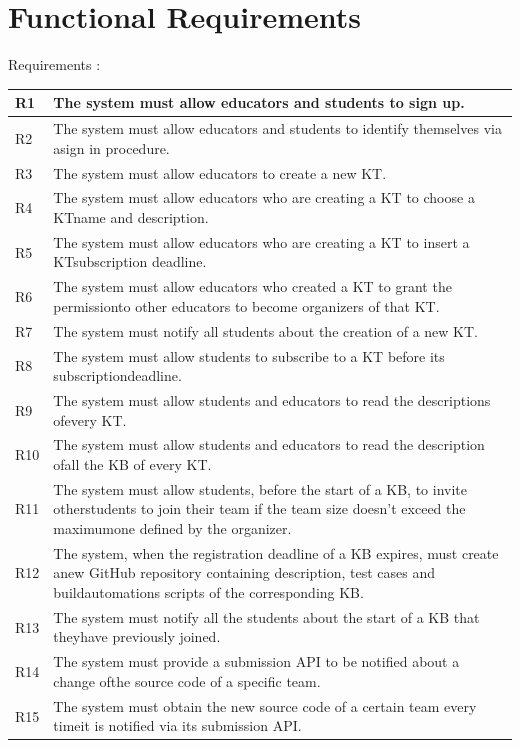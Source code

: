 \documentclass[11pt]{report}
\begin{document}
\section{Functional Requirements}
Requirements : 
\begin{table}[]
\begin{tabular}{|l|p{130mm}|}
\hline
R1 & The system must allow educators and students to sign up. \\ \hline
R2 & The system must allow educators and students to identify themselves via asign in procedure. \\ \hline
R3 & The system must allow educators to create a new KT. \\ \hline
R4 & The system must allow educators who are creating a KT to choose a KTname and description. \\ \hline
R5 & The system must allow educators who are creating a KT to insert a KTsubscription deadline. \\ \hline
R6 & The system must allow educators who created a KT to grant the permissionto other educators to become organizers of that KT. \\ \hline
R7 & The system must notify all students about the creation of a new KT. \\ \hline
R8 & The system must allow students to subscribe to a KT before its subscriptiondeadline. \\ \hline
R9 & The system must allow students and educators to read the descriptions ofevery KT. \\ \hline
R10 & The system must allow students and educators to read the description ofall the KB of every KT. \\ \hline
R11 & The system must allow students, before the start of a KB, to invite otherstudents to join their team if the team size doesn’t exceed the maximumone defined by the organizer. \\ \hline
R12 & The system, when the registration deadline of a KB expires, must create anew GitHub repository containing description, test cases and buildautomations scripts of the corresponding KB. \\ \hline
R13 & The system must notify all the students about the start of a KB that theyhave previously joined. \\ \hline
R14 & The system must provide a submission API to be notified about a change ofthe source code of a specific team. \\ \hline
R15 & The system must obtain the new source code of a certain team every timeit is notified via its submission API. \\ \hline

\end{tabular}
\end{table}
\end{document}
